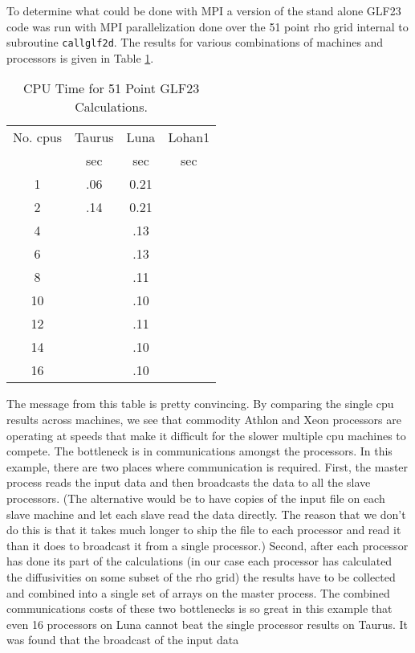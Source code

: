 To determine what could be done with MPI a 
version of the stand alone GLF23 code was run with MPI 
parallelization done  over the 51 point rho grid internal to
subroutine \texttt{callglf2d}. The results for various combinations of
machines and  processors is given in Table \ref{tab:MPI}.
\begin{table}
\begin{center}
\begin{tabular}
{cccc}
No.  cpus & Taurus & Luna & Lohan1 \\ 
& sec &sec &sec\\ \hline
1 & .06 & 0.21&   \\
2 & .14 & 0.21& \\
4 &     & .13 & \\
6 &     & .13 & \\
8 &     & .11 & \\
10 &     & .10 & \\
12 &     & .11 & \\ 
14 &     & .10 & \\
16 &     & .10 & \\ \hline
\end{tabular}
\end{center}
\caption{CPU Time for 51 Point GLF23 Calculations.\label{tab:MPI}}
\end{table}
The message from  this table is pretty convincing. By comparing the single cpu
results across machines, we see that  commodity Athlon and Xeon processors  are
operating at speeds that make it difficult for the slower  multiple cpu 
machines to compete. The bottleneck is in communications amongst the processors.
In this example, there are two  places where communication is required. First,
the master process reads the input data and then broadcasts the data  to all the
slave processors. (The alternative would be to have copies of the input file on
each slave machine and let each slave read the data directly. The reason that we
don't do this is that it takes much longer to ship the file to each processor
and read it than it does to broadcast it from a single processor.)  Second,
after each processor has done its part of the calculations (in our case each
processor has calculated the diffusivities on some subset of the rho grid) the
results have to be collected and combined into a single set of arrays on the
master process. The combined communications costs of these two bottlenecks  is
so great in this example that even 16 processors on Luna cannot beat the single
processor results on Taurus. It was found  that the broadcast of the input data
